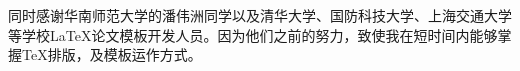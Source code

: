 \begin{ack}
同时感谢华南师范大学的潘伟洲同学以及清华大学、国防科技大学、上海交通大学等学校\LaTeX{}论文模板开发人员。因为他们之前的努力，致使我在短时间内能够掌握\TeX{}排版，及模板运作方式。
\end{ack}
